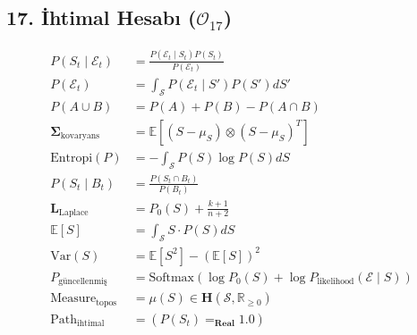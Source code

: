 \documentclass[11pt, a4paper]{article}
\begin{document}
\subsection{17. İhtimal Hesabı ($\mathcal{O}_{17}$)}
\begin{align}
P(S_t \mid \mathcal{E}_t) &= \frac{P(\mathcal{E}_t \mid S_t) P(S_t)}{P(\mathcal{E}_t)} \\
P(\mathcal{E}_t) &= \int_{\mathcal{S}} P(\mathcal{E}_t \mid S') P(S') dS' \\
P(A \cup B) &= P(A) + P(B) - P(A \cap B) \\
\mathbf{\Sigma}_{\text{kovaryans}} &= \mathbb{E}\left[ (S - \mu_S) \otimes (S - \mu_S)^T \right] \\
\text{Entropi}(P) &= -\int_{\mathcal{S}} P(S) \log P(S) dS \\
P(S_t \mid B_t) &= \frac{P(S_t \cap B_t)}{P(B_t)} \\
\mathbf{L}_{\text{Laplace}} &= P_0(S) + \frac{k+1}{n+2} \\
\mathbb{E}[S] &= \int_{\mathcal{S}} S \cdot P(S) dS \\
\text{Var}(S) &= \mathbb{E}[S^2] - (\mathbb{E}[S])^2 \\
P_{\text{güncellenmiş}} &= \text{Softmax}(\log P_0(S) + \log P_{\text{likelihood}}(\mathcal{E} \mid S)) \\
\text{Measure}_{\text{topos}} &= \mu(S) \in \mathbf{H}(\mathcal{S}, \mathbb{R}_{\ge 0}) \\
\text{Path}_{\text{ihtimal}} &= (P(S_t) =_{\mathbf{Real}} 1.0)
\end{align}
\end{document}
